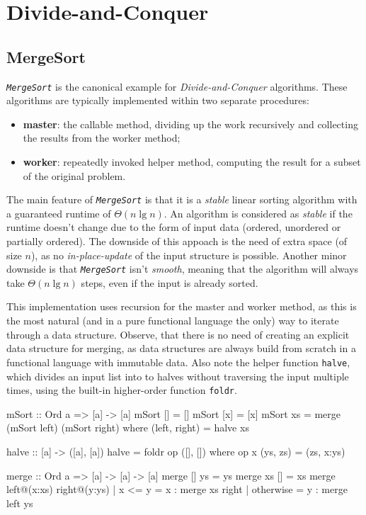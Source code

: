 \chapter{Divide-and-Conquer}


\section{MergeSort}

\emph{\texttt{MergeSort}} is the canonical example for \emph{Divide-and-Conquer} algorithms.
These algorithms are typically implemented within two separate procedures:
\begin{itemize}
    \item \textbf{master}: the callable method, dividing up the work recursively and collecting the results from the worker method;
    \item \textbf{worker}: repeatedly invoked helper method, computing the result for a subset of the original problem.
\end{itemize}

The main feature of \emph{\texttt{MergeSort}} is that it is a \emph{stable} linear sorting algorithm with a guaranteed runtime of $\Theta (n \lg n)$.
An algorithm is considered as \emph{stable} if the runtime doesn't change due to the form of input data (ordered, unordered or partially ordered).
The downside of this appoach is the need of extra space (of size $n$), as no \emph{in-place-update} of the input structure is possible.
Another minor downside is that \emph{\texttt{MergeSort}} isn't \emph{smooth}, meaning that the algorithm will always take $\Theta (n \lg n)$ steps, even if the input is already sorted.

\begin{impl}
This implementation uses recursion for the master and worker method, as this is the most natural (and in a pure functional language the only) way to iterate through a data structure.
Observe, that there is no need of creating an explicit data structure for merging, as data structures are always build from scratch in a functional language with immutable data.
Also note the helper function \texttt{halve}, which divides an input list into to halves without traversing the input multiple times, using the built-in higher-order function \texttt{foldr}.
\end{impl}

\begin{haskellcode}
  mSort :: Ord a => [a] -> [a]
  mSort [] = []
  mSort [x] = [x]
  mSort xs = merge (mSort left) (mSort right)
             where (left, right) = halve xs

  halve :: [a] -> ([a], [a])
  halve = foldr op ([], []) where op x (ys, zs) = (zs, x:ys)

  merge :: Ord a => [a] -> [a] -> [a]
  merge [] ys = ys
  merge xs [] = xs
  merge left@(x:xs) right@(y:ys)
      | x <= y    = x : merge xs right
      | otherwise = y : merge left ys
\end{haskellcode}

